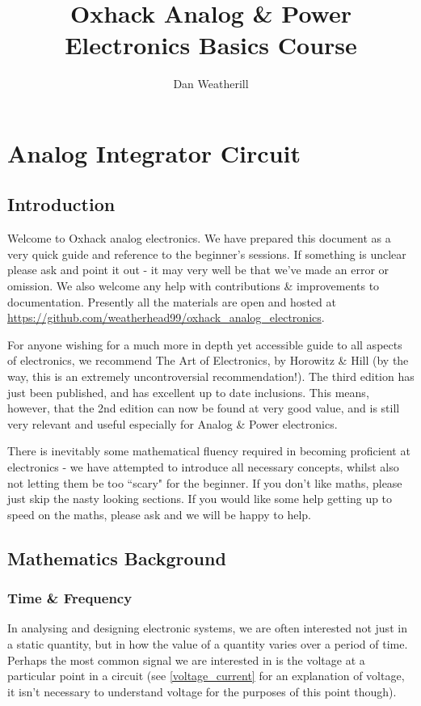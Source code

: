 \documentclass{memoir}
\title{Oxhack Analog \& Power Electronics Basics Course}
\author{Dan Weatherill}
\begin{document}
	\maketitle
	\chapter{Analog Integrator Circuit}
	
	\section{Introduction}
	Welcome to Oxhack analog electronics. We have prepared this document as a very quick guide and reference to the beginner's sessions. If something is unclear please ask and point it out - it may very well be that we've made an error or omission. We also welcome any help with contributions \& improvements to documentation. Presently all the materials are open and hosted at \url{https://github.com/weatherhead99/oxhack_analog_electronics}.

	For anyone wishing for a much more in depth yet accessible guide to all aspects of electronics, we recommend The Art of Electronics, by Horowitz \& Hill (by the way, this is an extremely uncontroversial recommendation!). The third edition has just been published, and has excellent up to date inclusions. This means, however, that the 2nd edition can now be found at very good value, and is still very relevant and useful especially for Analog \& Power electronics.
	
	There is inevitably some mathematical fluency required in becoming proficient at electronics - we have attempted to introduce all necessary concepts, whilst also not letting them be too ``scary" for the beginner. If you don't like maths, please just skip the nasty looking sections. If you would like some help getting up to speed on the maths, please ask and we will be happy to help.
	
	\section{Mathematics Background}
	\subsection{Time \& Frequency}
	In analysing and designing electronic systems, we are often interested not just in a static quantity, but in how the value of a quantity varies over a period of time. Perhaps the most common signal we are interested in is the voltage at a particular point in a circuit (see \autoref{voltage_current} for an explanation of voltage, it isn't necessary to understand voltage for the purposes of this point though).
\end{document}

